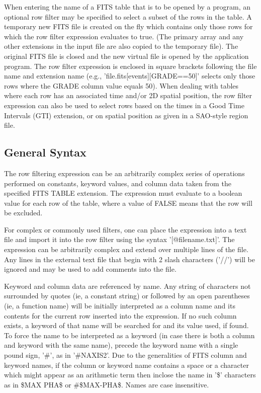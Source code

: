 \documentclass[11pt]{book}
\begin{document}
    When entering the name of a FITS table that is to be opened by a
    program, an optional row filter may be specified to select a subset
    of the rows in the table.  A temporary new FITS file is created on
    the fly which contains only those rows for which the row filter
    expression evaluates to true.  (The primary array and any other
    extensions in the input file are also copied to the temporary
    file).  The original FITS file is closed and the new virtual file
    is opened by the application program.  The row filter expression is
    enclosed in square brackets following the file name and extension
    name (e.g., 'file.fits[events][GRADE==50]'  selects only those rows
    where the GRADE column value equals 50).   When dealing with tables
    where each row has an associated time and/or 2D spatial position,
    the row filter expression can also be used to select rows based on
    the times in a Good Time Intervals (GTI) extension, or on spatial
    position as given in a SAO-style region file.


\subsection{General Syntax}

    The row filtering  expression can be an arbitrarily  complex series
    of operations performed  on constants,  keyword values,  and column
    data taken from the specified FITS TABLE extension.  The expression
    must evaluate to a boolean  value for each row  of the table, where
    a value of FALSE means that the row will be excluded.

    For complex or commonly  used filters, one can place the expression
    into a text file and import it into the row filter using the syntax
    '[@filename.txt]'.  The expression can be  arbitrarily complex and
    extend over multiple lines of the file.  Any lines in the external
    text file that begin with 2 slash characters ('//') will be ignored
    and may be used to add comments into the file.

    Keyword and   column data  are referenced by   name.  Any  string of
    characters not surrounded by    quotes (ie, a constant  string)   or
    followed by   an open parentheses (ie,   a  function name)   will be
    initially interpreted   as a column  name and  its contents for the
    current row inserted into the expression.  If no such column exists,
    a keyword of that  name will be searched for  and its value used, if
    found.  To force the  name to be  interpreted as a keyword (in case
    there is both a column and keyword with the  same name), precede the
    keyword name with a single pound sign, '\#', as in '\#NAXIS2'.  Due to
    the generalities of FITS column and  keyword names, if the column or
    keyword name  contains a space or a  character which might appear as
    an arithmetic  term then inclose  the  name in '\$'  characters as in
    \$MAX PHA\$ or \#\$MAX-PHA\$.  Names are case insensitive.
\end{document}

